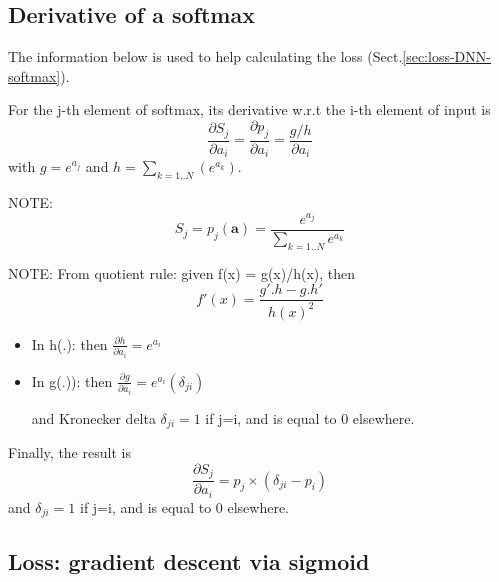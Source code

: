 \subsection{Derivative of a softmax}

The information below is used to help calculating the loss (Sect.\ref{sec:loss-DNN-softmax}).

For the j-th element of softmax, its derivative w.r.t the i-th element of input is
\begin{equation}
\frac{\partial S_j}{\partial a_i} = \frac{\partial p_j}{\partial a_i} = \frac{g/h}{\partial a_i}
\end{equation}
with $g = e^{a_j}$ and $h = \sum_{k=1..N}(e^{a_k})$.

NOTE:
\begin{equation}
S_j = p_j(\mathbf{a}) = \frac{e^{a_j}}{\sum_{k=1..N}e^{a_k}}
\end{equation}


NOTE: From quotient rule: given f(x) = g(x)/h(x), then
\begin{equation}
f'(x) = \frac{ g'.h - g.h'}{h(x)^2}
\end{equation}

\begin{itemize}
  
  \item In h(.): then $\frac{\partial h}{\partial a_i} = e^{a_i}$
  
  \item In g(.)): then $\frac{\partial g}{\partial a_i} = e^{a_i} (\delta_{ji})$
  
  and  Kronecker delta $\delta_{ji} = 1$ if j=i, and is equal to 0 elsewhere.
\end{itemize}

Finally, the result is
\begin{equation}
\frac{\partial S_j}{\partial a_i} = p_j \times (\delta_{ji} - p_i)
\end{equation}
and $\delta_{ji} = 1$ if j=i, and is equal to 0 elsewhere.

% 
% 

\subsection{Loss: gradient descent via sigmoid}
\label{sec:loss-DNN-sigmoid}


